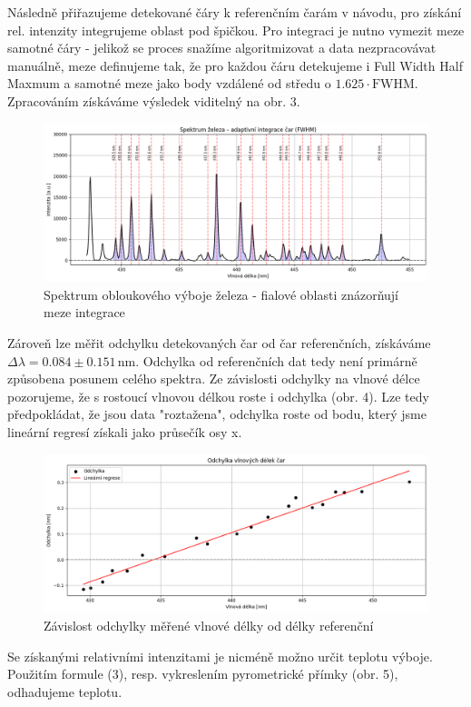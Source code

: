 \documentclass[czech,11pt,a4paper]{article}
\begin{document}
\begin{multicols}{2}
\begin{figure}[H]
		\end{figure}
		
		Následně přiřazujeme detekované čáry k referenčním čarám v návodu, pro získání rel. intenzity integrujeme oblast pod špičkou. Pro integraci je nutno vymezit meze samotné čáry - jelikož se proces snažíme algoritmizovat a data nezpracovávat manuálně, meze definujeme tak, že pro každou čáru detekujeme i Full Width Half Maxmum a samotné meze jako body vzdálené od středu o $1.625\cdot \mathrm{FWHM}$. Zpracováním získáváme výsledek viditelný na obr. 3.
		\begin{figure}[H]
			\centering
			\includegraphics[width=0.9\linewidth]{spectrum3}
			\caption{Spektrum obloukového výboje železa - fialové oblasti znázorňují meze integrace}			
		\end{figure}
		Zároveň lze měřit odchylku detekovaných čar od čar referenčních, získáváme \\ $\Delta \lambda = 0.084\pm 0.151 \,\mathrm{nm}$. Odchylka od referenčních dat tedy není primárně způsobena posunem celého spektra. Ze závislosti odchylky na vlnové délce pozorujeme, že s rostoucí vlnovou délkou roste i odchylka (obr. 4). Lze tedy předpokládat, že jsou data "roztažena", odchylka roste od bodu, který jsme lineární regresí získali jako průsečík osy x.
		\begin{figure}[H]
			\centering
			\includegraphics[width=0.9\linewidth]{zavislost}
			\caption{Závislost odchylky měřené vlnové délky od délky referenční}			
		\end{figure}
		Se získanými relativními intenzitami je nicméně možno určit teplotu výboje. Použitím formule (3), resp. vykreslením pyrometrické přímky (obr. 5), odhadujeme teplotu.

\end{multicols}
\end{document}
